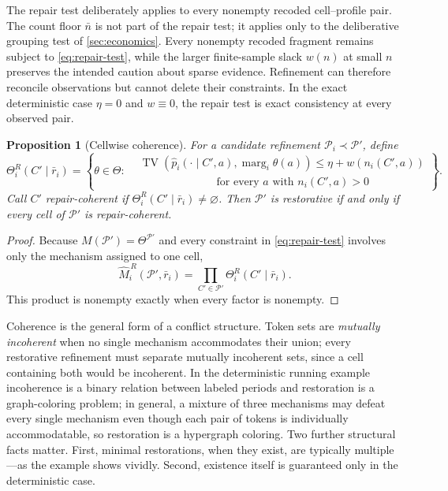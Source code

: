\documentclass[11pt]{article}
\newtheorem{proposition}[assumption]{Proposition}
\theoremstyle{definition}
\newcommand{\emptysetset}{\varnothing}
\newcommand{\TV}{\operatorname{TV}}
\newcommand{\marg}[1]{\operatorname{marg}_{#1}}
\begin{document}
The repair test deliberately applies to every nonempty recoded cell--profile pair.
The count floor $\bar n$ is not part of the repair test; it applies only to the deliberative grouping test of \cref{sec:economics}.
Every nonempty recoded fragment remains subject to \cref{eq:repair-test}, while the larger finite-sample slack $w(n)$ at small $n$ preserves the intended caution about sparse evidence.
Refinement can therefore reconcile observations but cannot delete their constraints.
In the exact deterministic case $\eta=0$ and $w\equiv0$, the repair test is exact consistency at every observed pair.

\begin{proposition}[Cellwise coherence]
\label{prop:coherence}
For a candidate refinement $\mathcal P_i\prec\mathcal P'$, define
\[
\Theta_i^{R}(C'\mid\bar r_i)
=
\left\{
\theta\in\Theta:
\begin{aligned}
&\TV\!\left(
  \hat p_i(\cdot\mid C',a),\marg{i}\theta(a)
 \right)
 \leq \eta+w\!\left(n_i(C',a)\right)\\[-0.2em]
&\hspace{7em}\text{for every $a$ with }n_i(C',a)>0
\end{aligned}
\right\}.
\]
Call $C'$ \emph{repair-coherent} if $\Theta_i^{R}(C'\mid\bar r_i)\neq\emptysetset$.
Then $\mathcal P'$ is restorative if and only if every cell of $\mathcal P'$ is repair-coherent.
\end{proposition}

\begin{proof}
Because $M(\mathcal P')=\Theta^{\mathcal P'}$ and every constraint in \cref{eq:repair-test} involves only the mechanism assigned to one cell,
\[
\widehat M_i^{\,R}(\mathcal P',\bar r_i)
=
\prod_{C'\in\mathcal P'}
\Theta_i^{R}(C'\mid\bar r_i).
\]
This product is nonempty exactly when every factor is nonempty.
\end{proof}

Coherence is the general form of a conflict structure.
Token sets are \emph{mutually incoherent} when no single mechanism accommodates their union; every restorative refinement must separate mutually incoherent sets, since a cell containing both would be incoherent.
In the deterministic running example incoherence is a binary relation between labeled periods and restoration is a graph-coloring problem; in general, a mixture of three mechanisms may defeat every single mechanism even though each pair of tokens is individually accommodatable, so restoration is a hypergraph coloring.
Two further structural facts matter.
First, minimal restorations, when they exist, are typically multiple---as the example shows vividly.
Second, existence itself is guaranteed only in the deterministic case.
\end{document}

